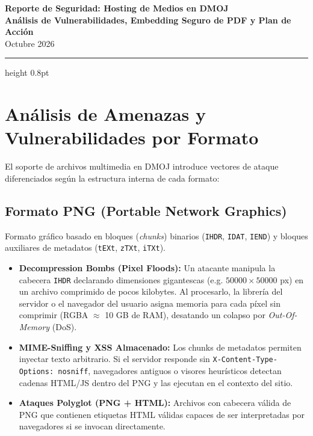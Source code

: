 \documentclass[11pt,a4paper]{article}
\begin{document}
\noindent
{\LARGE\textbf{\color{primary}Reporte de Seguridad: Hosting de Medios en DMOJ}}\\[0.25em]
{\large\textbf{\color{secondary}Análisis de Vulnerabilidades, Embedding Seguro de PDF y Plan de Acción}}\\[0.4em]
{\small\color{gray}Octubre 2026}
\vspace{0.4em}
\hrule height 0.8pt
\vspace{0.9em}

\section{Análisis de Amenazas y Vulnerabilidades por Formato}

El soporte de archivos multimedia en DMOJ introduce vectores de ataque diferenciados según la estructura interna de cada formato:

\subsection{Formato PNG (Portable Network Graphics)}
Formato gráfico basado en bloques (\textit{chunks}) binarios (\texttt{IHDR}, \texttt{IDAT}, \texttt{IEND}) y bloques auxiliares de metadatos (\texttt{tEXt}, \texttt{zTXt}, \texttt{iTXt}).
\begin{itemize}
    \item \textbf{Decompression Bombs (Pixel Floods):} Un atacante manipula la cabecera \texttt{IHDR} declarando dimensiones gigantescas (e.g. $50000 \times 50000$ px) en un archivo comprimido de pocos kilobytes. Al procesarlo, la librería del servidor o el navegador del usuario asigna memoria para cada píxel sin comprimir (RGBA $\approx$ 10 GB de RAM), desatando un colapso por \textit{Out-Of-Memory} (DoS).
    \item \textbf{MIME-Sniffing y XSS Almacenado:} Los chunks de metadatos permiten inyectar texto arbitrario. Si el servidor responde sin \texttt{X-Content-Type-Options: nosniff}, navegadores antiguos o visores heurísticos detectan cadenas HTML/JS dentro del PNG y las ejecutan en el contexto del sitio.
    \item \textbf{Ataques Polyglot (PNG + HTML):} Archivos con cabecera válida de PNG que contienen etiquetas HTML válidas capaces de ser interpretadas por navegadores si se invocan directamente.
\end{itemize}
\end{document}
